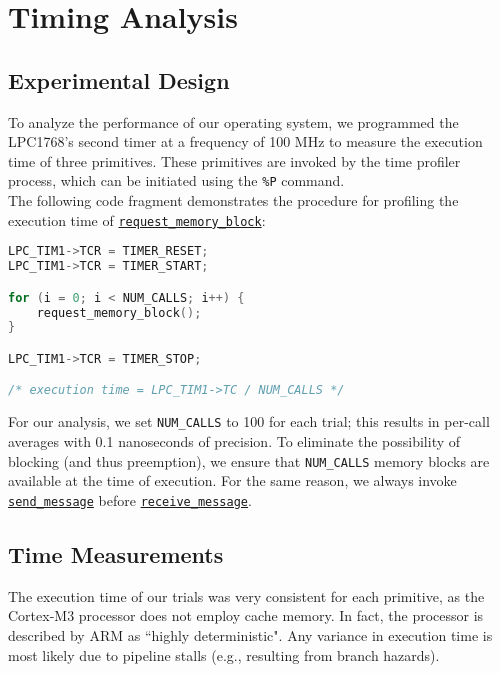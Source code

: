 \documentclass[12pt]{report}
\begin{document}
\chapter{Timing Analysis}


\section{Experimental Design}
\label{sec:timing}

To analyze the performance of our operating system, we programmed the LPC1768's second timer at a frequency of 100 MHz to measure the execution time of three primitives. These primitives are invoked by the time profiler process, which can be initiated using the \texttt{\%P} command.\\

The following code fragment demonstrates the procedure for profiling the execution time of \hyperref[alg:requestingmemoryblocks]{\texttt{request_memory_block}}:

\begin{minipage}{\textwidth}
\begin{lstlisting}[language=C, frame=single]
LPC_TIM1->TCR = TIMER_RESET;
LPC_TIM1->TCR = TIMER_START;

for (i = 0; i < NUM_CALLS; i++) {
    request_memory_block();
}

LPC_TIM1->TCR = TIMER_STOP;

/* execution time = LPC_TIM1->TC / NUM_CALLS */

\end{lstlisting}
\end{minipage}

For our analysis, we set \texttt{NUM_CALLS} to 100 for each trial; this results in per-call averages with 0.1 nanoseconds of precision. To eliminate the possibility of blocking (and thus preemption), we ensure that \texttt{NUM_CALLS} memory blocks are available at the time of execution. For the same reason, we always invoke \hyperref[alg:sendingmessages]{\texttt{send_message}} before \hyperref[alg:receivingmessages]{\texttt{receive_message}}.

\section{Time Measurements}

The execution time of our trials was very consistent for each primitive, as the Cortex-M3 processor does not employ cache memory. In fact, the processor is described by ARM as ``highly deterministic". Any variance in execution time is most likely due to pipeline stalls (e.g., resulting from branch hazards).
\end{document}
